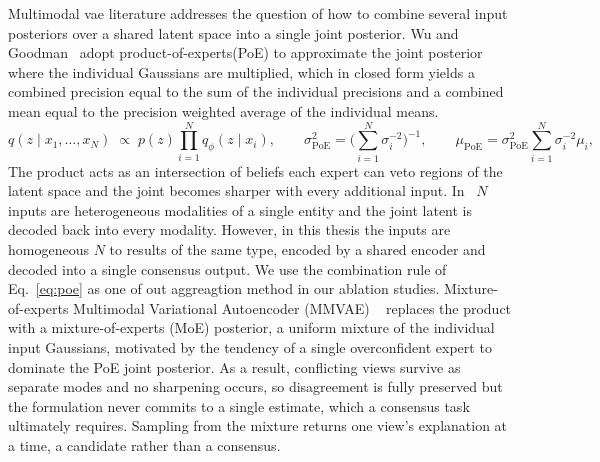 \documentclass[
  numbers=noenddot,
  english,  %
  a4paper,  %
  twoside,  %
  bibliography=totoc,
  headsepline,
  cleardoublepage=empty,
  parskip=half,
  draft=false
]{scrbook}
\theoremstyle{break}
\begin{document}
Multimodal \gls{vae} literature addresses the question of how to combine several input posteriors over a shared latent space into a single joint posterior. Wu and Goodman~\cite{c23} adopt product-of-experts(PoE) to approximate the joint posterior where the individual Gaussians are multiplied, which in closed form yields a combined precision equal to the sum of the individual precisions and a combined mean equal to the precision weighted average of the individual means.
%
\begin{equation}
	q(z \mid x_1, \dots, x_N) \;\propto\; p(z) \prod_{i=1}^{N} q_\phi(z \mid x_i),
	\qquad
	\sigma_{\text{PoE}}^{2} = \Big(\sum_{i=1}^{N}\sigma_i^{-2}\Big)^{-1},
	\qquad
	\mu_{\text{PoE}} = \sigma_{\text{PoE}}^{2}\sum_{i=1}^{N}\sigma_i^{-2}\mu_i ,
	\label{eq:poe}
\end{equation}
%
 The product acts as an intersection of beliefs each expert can veto regions of the latent space and the joint becomes sharper with every additional input. In~\cite{c23} $N$ inputs are heterogeneous modalities of a single
 entity and the joint latent is decoded back into every modality. However, in this thesis the inputs are homogeneous $N$  \gls{to} results of the same type, encoded by a shared encoder and decoded into a single consensus output. We use the combination rule of Eq.~\eqref{eq:poe} as one of out aggreagtion method in our ablation studies. Mixture-of-experts Multimodal Variational Autoencoder (MMVAE) ~\cite{c24} replaces the product with a mixture-of-experts (MoE) posterior, a uniform mixture of the individual input Gaussians, motivated by the tendency of a single overconfident expert to dominate the PoE joint posterior. As a result, conflicting views survive as separate modes and no sharpening occurs, so disagreement is fully preserved but the formulation never commits to a single estimate, which a consensus task ultimately requires. Sampling from the mixture returns one view's explanation at a time, a candidate rather than a consensus. 
 
\end{document}

